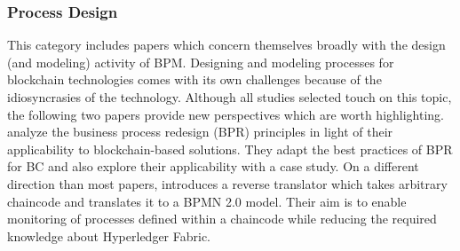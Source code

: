 \subsubsection{Process Design}\label{sssec:design}
This category includes papers which concern themselves broadly with the design (and modeling) activity of BPM. Designing and modeling processes for blockchain technologies comes with its own challenges because of the idiosyncrasies of the technology. Although all studies selected touch on this topic, the following two papers provide new perspectives which are worth highlighting. \citeauthor{milani_business_2020} \cite{milani_business_2020} analyze the business process redesign (BPR) principles in light of their applicability to blockchain-based solutions. They adapt the best practices of BPR for BC and also explore their applicability with a case study. On a different direction than most papers, \citeauthor{schinle_integration_2020} \cite{schinle_integration_2020} introduces a reverse translator which takes arbitrary chaincode and translates it to a BPMN 2.0 model. Their aim is to enable monitoring of processes defined within a chaincode while reducing the required knowledge about Hyperledger Fabric.